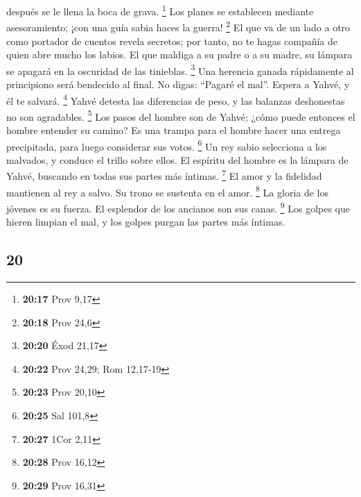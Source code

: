 \begin{paracol}{2}
después se le llena la boca de grava. \footnote{\textbf{20:17} Prov 9,17}
 Los planes se establecen mediante asesoramiento; ¡con
una guía sabia haces la guerra! \footnote{\textbf{20:18} Prov 24,6}
 El que va de un lado a otro como portador de cuentos
revela secretos; por tanto, no te hagas compañía de quien abre mucho los
labios.  El que maldiga a su padre o a su madre, su
lámpara se apagará en la oscuridad de las tinieblas. \footnote{\textbf{20:20}
  Éxod 21,17}  Una herencia ganada rápidamente al
principiono será bendecido al final.  No digas: ``Pagaré
el mal''. Espera a Yahvé, y él te salvará. \footnote{\textbf{20:22} Prov
  24,29; Rom 12,17-19}  Yahvé detesta las diferencias de
peso, y las balanzas deshonestas no son agradables. \footnote{\textbf{20:23}
  Prov 20,10}  Los pasos del hombre son de Yahvé; ¿cómo
puede entonces el hombre entender su camino?  Es una
trampa para el hombre hacer una entrega precipitada, para luego
considerar sus votos. \footnote{\textbf{20:25} Sal 101,8}
 Un rey sabio selecciona a los malvados, y conduce el
trillo sobre ellos.  El espíritu del hombre es la lámpara
de Yahvé, buscando en todas sus partes más íntimas. \footnote{\textbf{20:27}
  1Cor 2,11}  El amor y la fidelidad mantienen al rey a
salvo. Su trono se sustenta en el amor. \footnote{\textbf{20:28} Prov
  16,12}  La gloria de los jóvenes es su fuerza. El
esplendor de los ancianos son sus canas. \footnote{\textbf{20:29} Prov
  16,31}  Los golpes que hieren limpian el mal, y los
golpes purgan las partes más íntimas.

\switchcolumn
\begin{otherlanguage}{english}

\hypertarget{section-39}{%
\section{20}\label{section-39}}


\end{otherlanguage}
\end{paracol}

